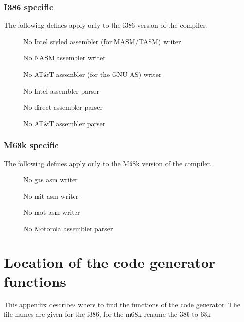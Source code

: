 \subsection{I386 specific}
The following defines apply only to the i386 version of the compiler.

\begin{description}
 \item[] No Intel styled assembler (for MASM/TASM) writer
 \item[] No NASM assembler writer
 \item[] No AT\&T assembler (for the GNU AS) writer
 \item[] No Intel assembler parser
 \item[] No direct assembler parser
 \item[] No AT\&T assembler parser
\end{description}

\subsection{M68k specific}
The following defines apply only to the M68k version of the compiler.

\begin{description}
 \item[] No gas asm writer
 \item[] No mit asm writer
 \item[] No mot asm writer
 \item[] No Motorola assembler parser
\end{description}

\chapter{Location of the code generator functions}

This appendix describes where to find the functions of
the code generator. The file names are given for the
i386, for the m68k rename the 386 to 68k

